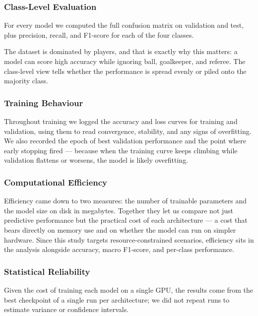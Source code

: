 \documentclass[preprint,12pt]{elsarticle}
\begin{document}
\subsubsection{Class-Level Evaluation}

For every model we computed the full confusion matrix on validation and test, plus precision, recall, and F1-score for each of the four classes.

The dataset is dominated by players, and that is exactly why this matters: a model can score high accuracy while ignoring ball, goalkeeper, and referee. The class-level view tells whether the performance is spread evenly or piled onto the majority class.

\subsubsection{Training Behaviour}

Throughout training we logged the accuracy and loss curves for training and validation, using them to read convergence, stability, and any signs of overfitting. We also recorded the epoch of best validation performance and the point where early stopping fired --- because when the training curve keeps climbing while validation flattens or worsens, the model is likely overfitting.

\subsubsection{Computational Efficiency}

Efficiency came down to two measures: the number of trainable parameters and the model size on disk in megabytes. Together they let us compare not just predictive performance but the practical cost of each architecture --- a cost that bears directly on memory use and on whether the model can run on simpler hardware. Since this study targets resource-constrained scenarios, efficiency sits in the analysis alongside accuracy, macro F1-score, and per-class performance.

\subsubsection{Statistical Reliability}

Given the cost of training each model on a single GPU, the results come from the best checkpoint of a single run per architecture; we did not repeat runs to estimate variance or confidence intervals.
\end{document}
